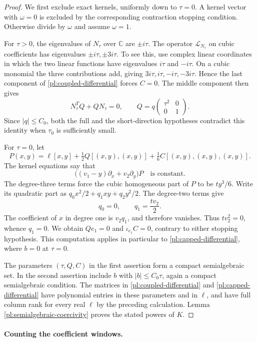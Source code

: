\documentclass[11pt]{amsart}
\theoremstyle{definition}
\theoremstyle{remark}
\numberwithin{equation}{section}
\begin{document}
\begin{proof}
We first exclude exact kernels, uniformly down to $\tau=0$. A kernel vector with $\omega=0$ is excluded by the corresponding contraction stopping condition. Otherwise divide by $\omega$ and assume $\omega=1$.

For $\tau>0$, the eigenvalues of $N_\tau$ over $\mathbb C$ are $\pm i\tau$. The operator $\mathcal L_{N_\tau}$ on cubic coefficients has eigenvalues $\pm i\tau,\pm3i\tau$. To see this, use complex linear coordinates in which the two linear functions have eigenvalues $i\tau$ and $-i\tau$. On a cubic monomial the three contributions add, giving $3i\tau,i\tau,-i\tau,-3i\tau$. Hence the last component of \eqref{pl:coupled-differential} forces $C=0$. The middle component then gives
\[
N_\tau^TQ+QN_\tau=0,
\qquad Q=q\begin{pmatrix}\tau^2&0\\0&1\end{pmatrix}.
\]
Since $|q|\le C_0$, both the full and the short-direction hypotheses contradict this identity when $\tau_0$ is sufficiently small.

For $\tau=0$, let
\[
P(x,y)=\ell[x,y]+\tfrac12Q[(x,y),(x,y)]+\tfrac16C[(x,y),(x,y),(x,y)].
\]
The kernel equations say that
\[
\bigl((v_1-y)\partial_x+v_2\partial_y\bigr)P
\quad\text{is constant}.
\]
The degree-three terms force the cubic homogeneous part of $P$ to be $ty^3/6$. Write its quadratic part as $q_0x^2/2+q_1xy+q_2y^2/2$. The degree-two terms give
\[
q_0=0,\qquad q_1=\frac{tv_2}{2}.
\]
The coefficient of $x$ in degree one is $v_2q_1$, and therefore vanishes. Thus $tv_2^2=0$, whence $q_1=0$. We obtain $Qe_1=0$ and $\iota_{e_1}C=0$, contrary to either stopping hypothesis. This computation applies in particular to \eqref{pl:capped-differential}, where $b=0$ at $\tau=0$.

The parameters $(\tau,Q,C)$ in the first assertion form a compact semialgebraic set. In the second assertion include $b$ with $|b|\le C_0\tau$, again a compact semialgebraic condition. The matrices in \eqref{pl:coupled-differential} and \eqref{pl:capped-differential} have polynomial entries in these parameters and in $\ell$, and have full column rank for every real $\ell$ by the preceding calculation. Lemma \ref{pl:semialgebraic-coercivity} proves the stated powers of $K$.
\end{proof}

\paragraph{Counting the coefficient windows.}
\end{document}
